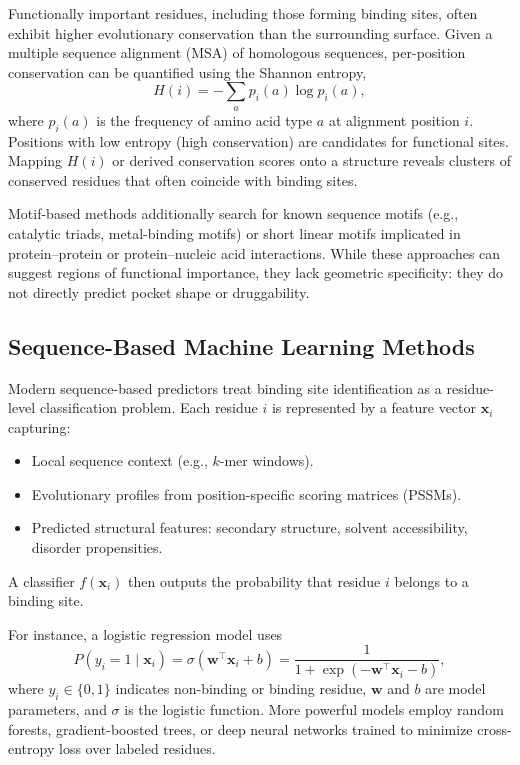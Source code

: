 \documentclass[12pt,a4paper]{article}
\begin{document}
Functionally important residues, including those forming binding sites, often exhibit higher evolutionary conservation than the surrounding surface. Given a multiple sequence alignment (MSA) of homologous sequences, per-position conservation can be quantified using the Shannon entropy,
\begin{equation}
H(i) = - \sum_{a} p_i(a) \log p_i(a),
\label{eq:shannon_entropy}
\end{equation}
where \(p_i(a)\) is the frequency of amino acid type \(a\) at alignment position \(i\). Positions with low entropy (high conservation) are candidates for functional sites. Mapping \(H(i)\) or derived conservation scores onto a structure reveals clusters of conserved residues that often coincide with binding sites.\cite{CH5_ghersi2011beyond}

Motif-based methods additionally search for known sequence motifs (e.g., catalytic triads, metal-binding motifs) or short linear motifs implicated in protein--protein or protein--nucleic acid interactions.\cite{CH5_ghersi2011beyond} While these approaches can suggest regions of functional importance, they lack geometric specificity: they do not directly predict pocket shape or druggability.

\subsection{Sequence-Based Machine Learning Methods}

Modern sequence-based predictors treat binding site identification as a residue-level classification problem. Each residue \(i\) is represented by a feature vector \(\mathbf{x}_i\) capturing:
\begin{itemize}
    \item Local sequence context (e.g., \(k\)-mer windows).
    \item Evolutionary profiles from position-specific scoring matrices (PSSMs).
    \item Predicted structural features: secondary structure, solvent accessibility, disorder propensities.
\end{itemize}
A classifier \(f(\mathbf{x}_i)\) then outputs the probability that residue \(i\) belongs to a binding site.

For instance, a logistic regression model uses
\begin{equation}
P(y_i = 1 \mid \mathbf{x}_i) = \sigma(\mathbf{w}^\top \mathbf{x}_i + b) = \frac{1}{1 + \exp(-\mathbf{w}^\top \mathbf{x}_i - b)},
\label{eq:logistic_regression}
\end{equation}
where \(y_i \in \{0,1\}\) indicates non-binding or binding residue, \(\mathbf{w}\) and \(b\) are model parameters, and \(\sigma\) is the logistic function. More powerful models employ random forests, gradient-boosted trees, or deep neural networks trained to minimize cross-entropy loss over labeled residues.
\end{document}
